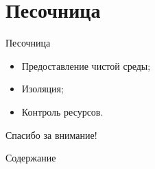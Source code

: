 \documentclass[xetex,mathserif,serif,10pt]{beamer}
\newenvironment{sframe}[2]{\section{#1}\begin{frame}[label=#2]{#1}}{\end{frame}}
\begin{document}
    \begin{sframe}{Песочница}{sandbox}
        \begin{itemize}
            \item Предоставление чистой среды;
            \item Изоляция;
            \item Контроль ресурсов.
        \end{itemize}
        \begin{figure}
            \resizebox{\columnwidth}{!}{
                
            }
        \end{figure}
    \end{sframe}

    \begin{frame}
        \Large\centering Спасибо за внимание!
    \end{frame}

    \begin{frame}{Содержание}
        \tableofcontents
    \end{frame}
\end{document}
